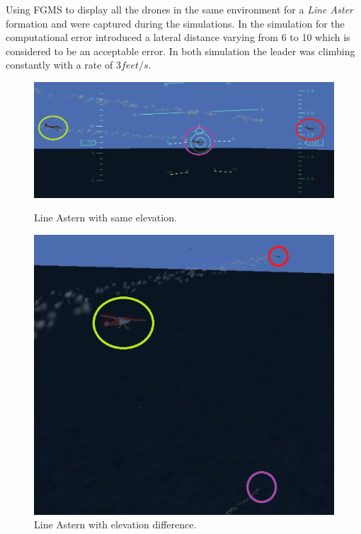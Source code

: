 
Using FGMS to display all the drones in the same environment for a \textit{Line
  Aster} formation   and 
were captured during the simulations. In the simulation for 
the computational error introduced a lateral distance varying from 6 to 10 which
is considered to be an acceptable error. In both simulation the leader was
climbing constantly with a rate of $3feet/s$.

\begin{figure}[p]
\centering
\includegraphics[scale=0.5]{src/img/line2.png}
\caption{Line Astern with same elevation.}
\label{img:line2}
\includegraphics[scale=0.8]{src/img/line1.png}
\caption{Line Astern with elevation difference.}
\label{img:line1}
\end{figure}
\newpage

